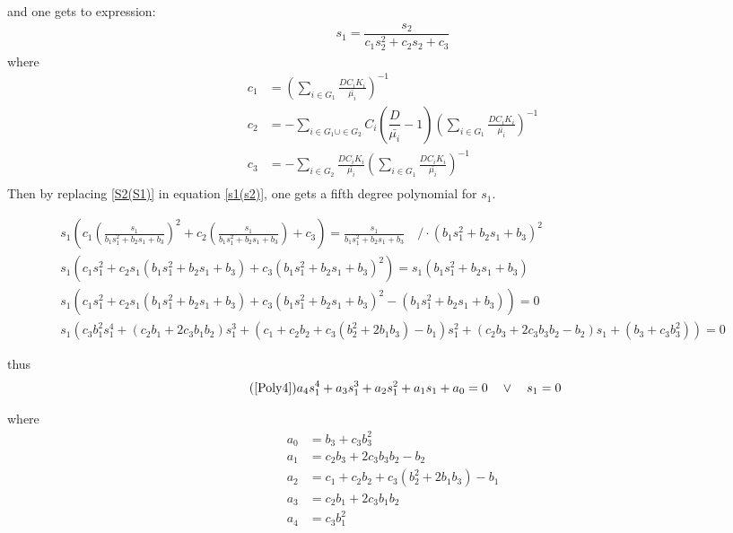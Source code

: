 \documentclass[processes,article,submit,moreauthors,pdftex]{Definitions/mdpi}
\begin{document}
and one gets to expression:
\begin{align}
\label{s1(s2)} s_1 = \dfrac{s_2}{c_1s_2^2 + c_2s_2 + c_3}
\end{align}
where
\begin{align}
\displaystyle c_1 & =  \left(\sum \limits_{i \in G_1 } \frac{DC_iK_i}{\bar{\mu_i}} \right)^{-1} \\
\displaystyle c_2 & = -\sum \limits_{i \in G_1 \cup \in G_2 } C_i\left(\dfrac{D}{\bar{\mu_i}}-1\right)  \left(\sum \limits_{i \in G_1 } \frac{DC_iK_i}{\bar{\mu_i}} \right)^{-1} \\
\displaystyle c_3 & = -\sum \limits_{i \in G_2} \frac{DC_iK_i}{\bar{\mu_i}} \left(\sum \limits_{i \in G_1 } \frac{DC_iK_i}{\bar{\mu_i}} \right)^{-1} \\
\end{align} 
Then by replacing  \eqref{S2(S1)} in equation \eqref{s1(s2)}, one gets a fifth degree polynomial for $s_1$. 

\begin{align}
s_1\left( c_1\left( \frac{s_1}{b_1s_1^2+b_2s_1+b_3} \right)^2 + c_2\left( \frac{s_1}{b_1s_1^2+b_2s_1+b_3} \right) + c_3 \right) =  \frac{s_1}{b_1s_1^2+b_2s_1+b_3}  \quad /\cdot  \left(b_1s_1^2+b_2s_1+b_3\right)^2\\
s_1\left( c_1s_1^2 + c_2s_1\left(b_1s_1^2+b_2s_1+b_3\right)  + c_3\left(b_1s_1^2+b_2s_1+b_3\right)^2 \right) =  s_1\left(b_1s_1^2+b_2s_1+b_3\right) \\
s_1\left( c_1s_1^2 + c_2s_1\left(b_1s_1^2+b_2s_1+b_3\right)  + c_3\left(b_1s_1^2+b_2s_1+b_3\right)^2 - \left(b_1s_1^2+b_2s_1+b_3\right) \right) = 0 \\
s_1\left( c_3b_1^2s_1^4+(c_2b_1+2c_3b_1b_2)s_1^3+(c_1+c_2b_2 +c_3(b_2^2 + 2b_1b_3)-b_1)s_1^2+(c_2b_3+2c_3b_3b_2 -b_2)s_1+(b_3 + c_3b_3^2)\right) = 0 
\end{align} 

thus 
\begin{align}
\tag{\ref{Poly4}} a_4s_1^4+a_3s_1^3+a_2s_1^2+a_1s_1+a_0 = 0 \quad  \vee \quad s_1 = 0
\end{align}

where 
\begin{align}
a_0 & = b_3 + c_3b_3^2\\
a_1 & = c_2b_3+2c_3b_3b_2 -b_2\\
a_2 & = c_1+c_2b_2 +c_3(b_2^2 + 2b_1b_3)-b_1 \\
a_3 & = c_2b_1+2c_3b_1b_2\\
a_4 & = c_3b_1^2
\end{align}
\end{document}
